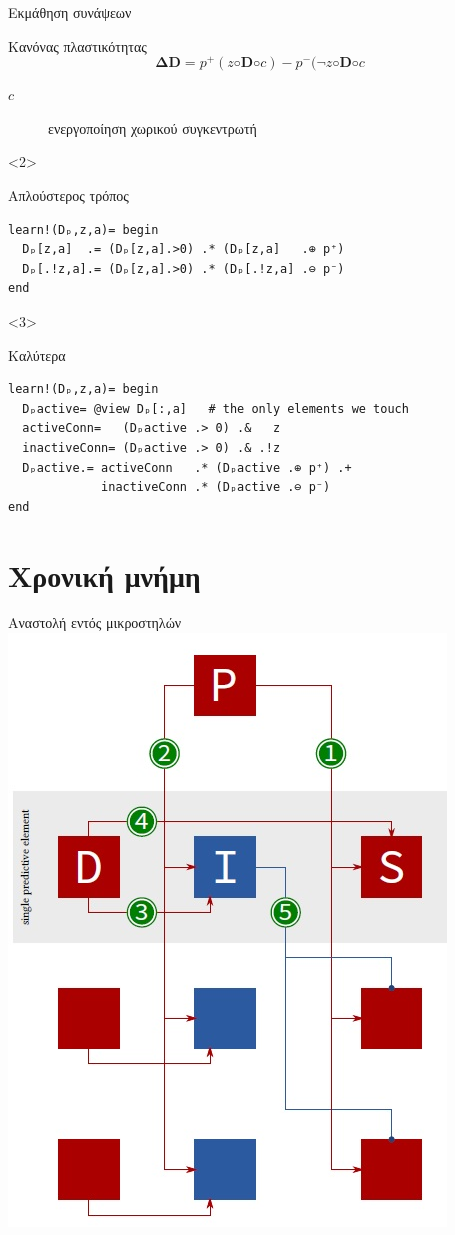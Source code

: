 \documentclass[10pt,lualatex]{beamer}
\begin{document}
\begin{frame}[fragile]{Εκμάθηση συνάψεων}
\begin{block}{Κανόνας πλαστικότητας}
  \[ \mathbf{ΔD} = p^+(z◦\mathbf{D}◦c) - p^-(\lnot z◦ \mathbf{D}◦c\]
  \begin{description}
    \item[$c$] ενεργοποίηση χωρικού συγκεντρωτή
  \end{description}
\end{block}
\begin{onlyenv}<2>
\begin{block}{Απλούστερος τρόπος}
\begin{verbatim}
learn!(Dₚ,z,a)= begin
  Dₚ[z,a]  .= (Dₚ[z,a].>0) .* (Dₚ[z,a]   .⊕ p⁺)
  Dₚ[.!z,a].= (Dₚ[z,a].>0) .* (Dₚ[.!z,a] .⊖ p⁻)
end
\end{verbatim}
\end{block}
\end{onlyenv}
\begin{onlyenv}<3>
\begin{block}{Καλύτερα}
\begin{verbatim}
learn!(Dₚ,z,a)= begin
  Dₚactive= @view Dₚ[:,a]   # the only elements we touch
  activeConn=   (Dₚactive .> 0) .&   z
  inactiveConn= (Dₚactive .> 0) .& .!z
  Dₚactive.= activeConn   .* (Dₚactive .⊕ p⁺) .+
             inactiveConn .* (Dₚactive .⊖ p⁻)
end
\end{verbatim}
\end{block}
\end{onlyenv}
\end{frame}

\section{Χρονική μνήμη}

\begin{frame}{Αναστολή \alert{εντός} μικροστηλών}
  \centering
  \includegraphics[width=.5\textwidth]{../figures/temporal_hardware}
\end{frame}
\end{document}
